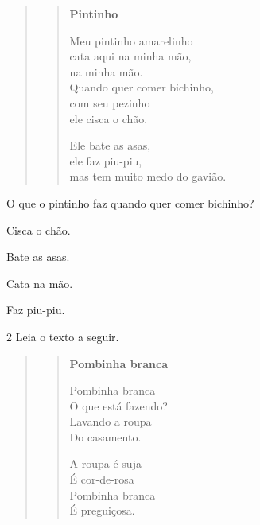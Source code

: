 \begin{quote}
\begin{verse}
\textbf{Pintinho}

Meu pintinho amarelinho\\
cata aqui na minha mão,\\ 
na minha mão.\\
Quando quer comer bichinho,\\ 
com seu pezinho\\ 
ele cisca o chão.

Ele bate as asas,\\
ele faz piu-piu,\\ 
mas tem muito medo do gavião.
\end{verse}

\end{quote}

O que o pintinho faz quando quer comer bichinho?

\begin{escolha}
	\item Cisca o chão.

	\item Bate as asas.

	\item Cata na mão.

	\item Faz piu-piu.
\end{escolha}

\pagebreak
\num{2} Leia o texto a seguir.

\begin{quote}
\begin{verse}
\textbf{Pombinha branca}

Pombinha branca \\
O que está fazendo?\\
Lavando a roupa\\
Do casamento.

A roupa é suja\\
É cor-de-rosa\\
Pombinha branca\\
É preguiçosa.

\end{verse}

\end{quote}

